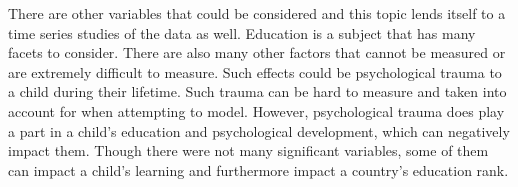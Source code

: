 \documentclass[12pt,english]{article}
\begin{document}
There are other variables that could be considered and this topic lends itself to a time series studies of the data as well. Education is a subject that has many facets to consider. There are also many other factors that cannot be measured or are extremely difficult to measure. Such effects could be psychological trauma to a child during their lifetime. Such trauma can be hard to measure and taken into account for when attempting to model. However, psychological trauma does play a part in a child's education and psychological development, which can negatively impact them. Though there were not many significant variables, some of them can impact a child’s learning and furthermore impact a country’s education rank. 
\newpage



\nocite{*}
\end{document}
